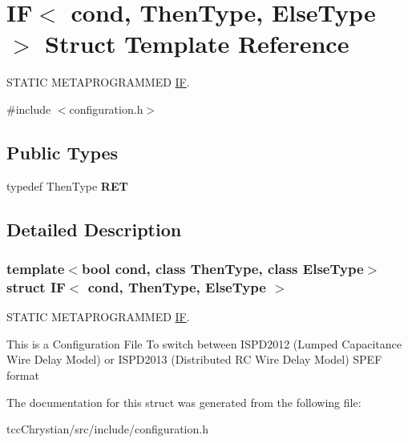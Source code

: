 \hypertarget{structIF}{\section{I\-F$<$ cond, Then\-Type, Else\-Type $>$ Struct Template Reference}
\label{structIF}
}


S\-T\-A\-T\-I\-C M\-E\-T\-A\-P\-R\-O\-G\-R\-A\-M\-M\-E\-D \hyperlink{structIF}{I\-F}.  




{\ttfamily \#include $<$configuration.\-h$>$}

\subsection*{Public Types}
\begin{DoxyCompactItemize}
\item 
\hypertarget{structIF_af93da5fd47eed555ff23c8d9022f8212}{typedef Then\-Type {\bfseries R\-E\-T}}\label{structIF_af93da5fd47eed555ff23c8d9022f8212}

\end{DoxyCompactItemize}


\subsection{Detailed Description}
\subsubsection*{template$<$bool cond, class Then\-Type, class Else\-Type$>$struct I\-F$<$ cond, Then\-Type, Else\-Type $>$}

S\-T\-A\-T\-I\-C M\-E\-T\-A\-P\-R\-O\-G\-R\-A\-M\-M\-E\-D \hyperlink{structIF}{I\-F}. 

This is a Configuration File To switch between I\-S\-P\-D2012 (Lumped Capacitance Wire Delay Model) or I\-S\-P\-D2013 (Distributed R\-C Wire Delay Model) S\-P\-E\-F format 

The documentation for this struct was generated from the following file\-:\begin{DoxyCompactItemize}
\item 
tcc\-Chrystian/src/include/configuration.\-h\end{DoxyCompactItemize}
